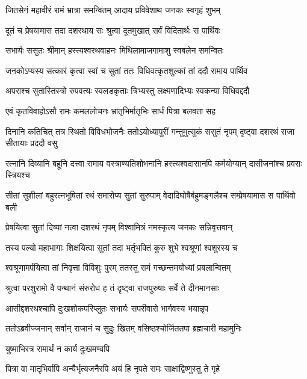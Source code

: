\twolineshloka
{जितसेनं महावीरं रामं भ्रात्रा समन्वितम्}
{आदाय प्रविवेशाथ जनकः स्वगृहं शुभम्} %

\twolineshloka
{दूतं च प्रेषयामास तदा दशरथाय सः}
{श्रुत्वा दूतमुखात् सर्वं विदितार्थः स पार्थिवः} %

\twolineshloka
{सभार्यः ससुतः श्रीमान् हस्त्यश्वरथवाहनः}
{मिथिलामाजगामाशु स्वबलेन समन्वितः} %

\twolineshloka
{जनकोऽप्यस्य सत्कारं कृत्वा स्वां च सुतां ततः}
{विधिवत्कृतशुल्कां तां ददौ रामाय पार्थिव} %

\twolineshloka
{अपराश्च सुतास्तिस्त्रो रुपवत्यः स्वलडकृताः}
{त्रिभ्यस्तु लक्ष्मणादिभ्यः स्वकन्या विधिवद्ददौ} %

\twolineshloka
{एवं कृतविवाहोऽसौ रामः कमललोचनः}
{भ्रातृभिर्मातृभिः सार्धं पित्रा बलवता सह} %

\threelineshloka
{दिनानि कतिचित् तत्र स्थितो विविधभोजनैः}
{ततोऽयोध्यापुरीं गन्तुमुत्सुकं ससुतं नृपम्}
{दृष्ट्वा दशरथं राजा सीतायाः प्रददौ वसु} %

\fourlineindentedshloka
{रत्नानि दिव्यानि बहूनि दत्त्वा}
{रामाय वस्त्राण्यतिशोभनानि}
{हस्त्यश्वदासानपि कर्मयोग्यान्}
{दासीजनांश्च प्रवराः स्त्रियश्च} %

\fourlineindentedshloka
{सीतां सुशीलां बहुरत्नभूषितां}
{रथं समारोप्य सुतां सुरुपाम्}
{वेदादिघोषैर्बहुमङ्गलैश्च}
{सम्प्रेषयामास स पार्थिवो बली} %

\twolineshloka
{प्रेषयित्वा सुतां दिव्यां नत्वा दशरथं नृपम्}
{विश्वामित्रं नमस्कृत्य जनकः सन्निवृत्तवान्} %

\twolineshloka
{तस्य पल्यो महाभागाः शिक्षयित्वा सुतां तदा}
{भर्तृभक्तिं कुरु शुभे श्वश्रूणां श्वशुरस्य च} %

\twolineshloka
{श्वश्रूणामर्पयित्वा तां निवृत्ता विविशुः पुरम्}
{ततस्तु रामं गच्छन्तमयोध्यां प्रबलान्वितम्} %

\twolineshloka
{श्रुत्वा परशुरामो वै पन्थानं संरुरोध ह}
{तं दृष्ट्वा राजपुरुषाः सर्वे ते दीनमानसाः} %

\twolineshloka
{आसीद्दशरथश्चापि दुःखशोकपरिप्लुतः}
{सभार्यः सपरीवारो भार्गवस्य भयान्नृप} %

\twolineshloka
{ततोऽब्रवीज्जनान् सर्वान् राजानं च सुदुः खितम्}
{वसिष्ठश्चोर्जिततपा ब्रह्मचारी महामुनिः} %


\onelineshloka
{युष्माभिरत्र रामार्थं न कार्य दुःखमण्वपि} %

\twolineshloka
{पित्रा वा मातृभिर्वापि अन्यैर्भृत्यजनैरपि}
{अयं हि नृपते रामः साक्षाद्विष्णुस्तु ते गृहे} %

